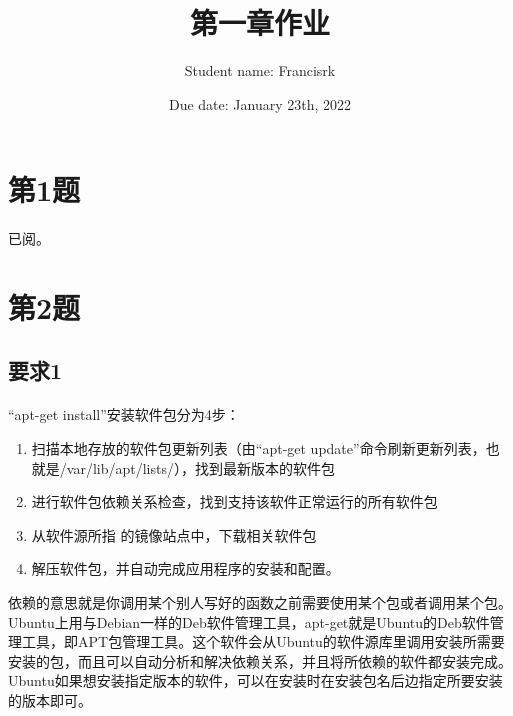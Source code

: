 \documentclass[40pt,a4paper，UTF8]{ctexart}
\title{第一章作业}
\author{Student name: Francisrk}
\date{Due date: January 23th, 2022}
\begin{document}
\maketitle   %

\section{第1题}
\paragraph{}
已阅。
\paragraph{}

\section{第2题}
\subsection{要求1}
\paragraph{}

“apt-get install”安装软件包分为4步：
\begin{enumerate}
\item 扫描本地存放的软件包更新列表（由“apt-get update”命令刷新更新列表，也就是/var/lib/apt/lists/），找到最新版本的软件包
\item 进行软件包依赖关系检查，找到支持该软件正常运行的所有软件包
\item 从软件源所指 的镜像站点中，下载相关软件包
\item 解压软件包，并自动完成应用程序的安装和配置。
\end{enumerate}


依赖的意思就是你调用某个别人写好的函数之前需要使用某个包或者调用某个包。Ubuntu上用与Debian一样的Deb软件管理工具，apt-get就是Ubuntu的Deb软件管理工具，即APT包管理工具。这个软件会从Ubuntu的软件源库里调用安装所需要安装的包，而且可以自动分析和解决依赖关系，并且将所依赖的软件都安装完成。Ubuntu如果想安装指定版本的软件，可以在安装时在安装包名后边指定所要安装的版本即可。

\paragraph{}
\end{document}
